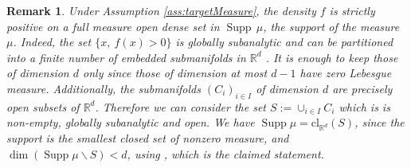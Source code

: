 \documentclass[11pt]{article}
\DeclareMathOperator{\supp}{Supp}
\newcommand{\R}{\mathbb R}
\newcommand{\1}{\mathbbm{1}}
\newtheorem{rem}[lem]{Remark}
\numberwithin{equation}{section}
\begin{document}
\begin{rem}
	Under Assumption \ref{ass:targetMeasure}, the density $f$ is strictly positive on a full measure open dense set in $\supp\,\mu$, the support of the measure $\mu$. Indeed, the set $\{x,\:f(x)>0\}$ is globally subanalytic and can be partitioned into a finite number of embedded submanifolds in $\R^d$ \cite[4.8]{driesmiller}. It is enough to keep those of dimension $d$ only since those of dimension at most $d-1$ have zero Lebesgue measure. Additionally, the submanifolds $(C_i)_{i\in I}$ of dimension $d$ are precisely open subsets of $\R^d$. Therefore we can consider the set $S :=\cup_{i\in I}C_i$ which is is non-empty, globally subanalytic and open. We have $\supp \mu = \mathrm{cl}_{\R^d}(S)$, since the support is the smallest closed set of nonzero measure, and $\dim(\supp\mu \backslash S) < d$, using \cite[4.7]{driesmiller}, which is the claimed statement.
	\label{rem:densityPositive}
\end{rem}
\end{document}
